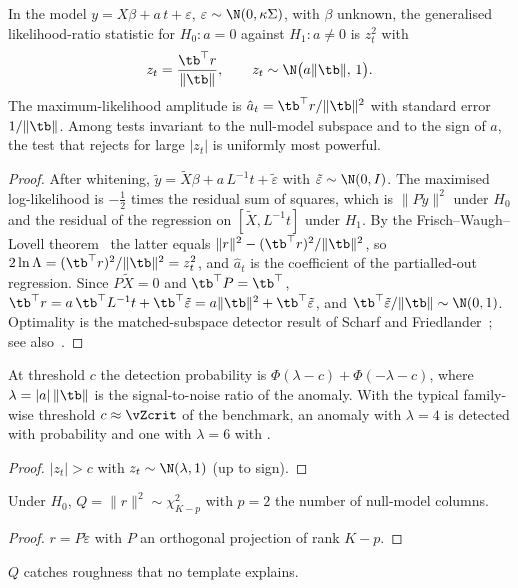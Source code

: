 \begin{theorem}\label{thm-glrt}
In the model $y=X\beta+a\,t+\varepsilon$, $\varepsilon\sim\N(0,\kappa\Sigma)$, with $\beta$ unknown, the generalised
likelihood-ratio statistic for $H_0:a=0$ against $H_1:a\ne0$ is $z_t^2$ with
\begin{equation}\label{eq-z}
z_t=\frac{\tb^\top r}{\|\tb\|},\qquad z_t\sim\N\bigl(a\|\tb\|,\,1\bigr).
\end{equation}
The maximum-likelihood amplitude is $\hat a_t=\tb^\top r/\|\tb\|^2$ with standard error $1/\|\tb\|$. Among tests
invariant to the null-model subspace and to the sign of $a$, the test that rejects for large $|z_t|$ is uniformly most
powerful.
\end{theorem}
\begin{proof}
After whitening, $\tilde y=\tilde X\beta+a\,L^{-1}t+\tilde\varepsilon$ with $\tilde\varepsilon\sim\N(0,I)$. The maximised
log-likelihood is $-\frac12$ times the residual sum of squares, which is $\|P\tilde y\|^2$ under $H_0$ and the residual of
the regression on $[\tilde X,L^{-1}t]$ under $H_1$. By the Frisch--Waugh--Lovell theorem~\cite{lovell1963} the latter equals
$\|r\|^2-(\tb^\top r)^2/\|\tb\|^2$, so $2\ln\Lambda=(\tb^\top r)^2/\|\tb\|^2=z_t^2$, and $\hat a_t$ is the
coefficient of the partialled-out regression. Since $P\tilde X=0$ and $\tb^\top P=\tb^\top$,
$\tb^\top r=a\,\tb^\top L^{-1}t+\tb^\top\tilde\varepsilon=a\|\tb\|^2+\tb^\top\tilde\varepsilon$, and
$\tb^\top\tilde\varepsilon/\|\tb\|\sim\N(0,1)$. Optimality is the matched-subspace detector result of Scharf and
Friedlander~\cite{scharf1994}; see also~\cite{kay1998}.
\end{proof}

\begin{corollary}\label{cor-power}
At threshold $c$ the detection probability is $\Phi(\lambda-c)+\Phi(-\lambda-c)$, where $\lambda=|a|\,\|\tb\|$ is the
signal-to-noise ratio of the anomaly. With the typical family-wise threshold $c\approx\vZcrit$ of the benchmark, an
anomaly with $\lambda=4$ is detected with probability \vPowThFour{} and one with $\lambda=6$ with \vPowThSix.
\end{corollary}
\begin{proof}
$|z_t|>c$ with $z_t\sim\N(\lambda,1)$ (up to sign).
\end{proof}

\begin{proposition}\label{prop-q}
Under $H_0$, $Q=\|r\|^2\sim\chi^2_{K-p}$ with $p=2$ the number of null-model columns.
\end{proposition}
\begin{proof}
$r=P\tilde\varepsilon$ with $P$ an orthogonal projection of rank $K-p$.
\end{proof}
$Q$ catches roughness that no template explains.

